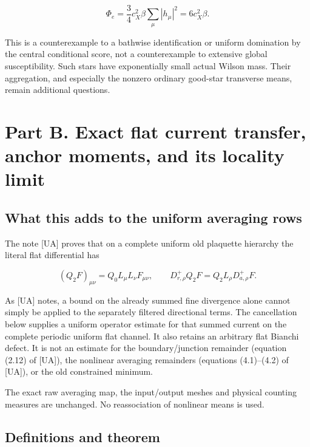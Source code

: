 \documentclass[
  11pt,
]{article}
\begin{document}
\[
 \Phi_e=\frac34c_X^2\beta\sum_{\mu}|h_\mu|^2=6c_X^2\beta.
\]

This is a counterexample to a bathwise identification or uniform
domination by the central conditional score, not a counterexample to
extensive global susceptibility. Such stars have exponentially small
actual Wilson mass. Their aggregation, and especially the nonzero
ordinary good-star transverse means, remain additional questions.

\newpage

\hypertarget{part-b.-exact-flat-current-transfer-anchor-moments-and-its-locality-limit}{%
\section{Part B. Exact flat current transfer, anchor moments, and its
locality
limit}\label{part-b.-exact-flat-current-transfer-anchor-moments-and-its-locality-limit}}

\hypertarget{what-this-adds-to-the-uniform-averaging-rows}{%
\subsection{What this adds to the uniform averaging
rows}\label{what-this-adds-to-the-uniform-averaging-rows}}

The note [UA] proves that on a complete uniform old plaquette hierarchy
the literal flat differential has

\[
(Q_2F)_{\mu\nu}=Q_0L_\mu L_\nu F_{\mu\nu},
\qquad D_{r,\rho}^{+}Q_2F=Q_2L_\rho D_{a,\rho}^{+}F.
\]

As [UA] notes, a bound on the already summed fine divergence
alone cannot simply be applied to the separately filtered directional
terms. The cancellation below supplies a uniform operator estimate for
that summed current on the complete periodic uniform flat channel. It
also retains an arbitrary flat Bianchi defect. It is not an estimate for
the boundary/junction remainder (equation (2.12) of [UA]), the nonlinear averaging
remainders (equations (4.1)--(4.2) of [UA]), or the old constrained minimum.

The exact raw averaging map, the input/output meshes and physical
counting measures are unchanged. No reassociation of nonlinear means is
used.

\hypertarget{definitions-and-theorem}{%
\subsection{Definitions and theorem}\label{definitions-and-theorem}}
\end{document}

